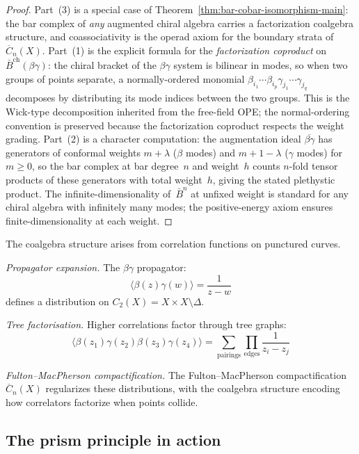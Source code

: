 \begin{proof}
Part~(3) is a special case of Theorem~\ref{thm:bar-cobar-isomorphism-main}: the bar complex of \emph{any} augmented chiral algebra carries a factorization coalgebra structure, and coassociativity is the operad axiom for the boundary strata of~$\overline{C}_n(X)$. Part~(1) is the explicit formula for the \emph{factorization coproduct} on $\bar{B}^{\mathrm{ch}}(\beta\gamma)$: the chiral bracket of the $\beta\gamma$ system is bilinear in modes, so when two groups of points separate, a normally-ordered monomial $\beta_{i_1}\cdots\beta_{i_p}\gamma_{j_1}\cdots\gamma_{j_q}$ decomposes by distributing its mode indices between the two groups. This is the Wick-type decomposition inherited from the free-field OPE; the normal-ordering convention is preserved because the factorization coproduct respects the weight grading. Part~(2) is a character computation: the augmentation ideal $\overline{\beta\gamma}$ has generators of conformal weights $m + \lambda$ ($\beta$ modes) and $m + 1 - \lambda$ ($\gamma$ modes) for $m \geq 0$, so the bar complex at bar degree~$n$ and weight~$h$ counts $n$-fold tensor products of these generators with total weight~$h$, giving the stated plethystic product. The infinite-dimensionality of~$\bar{B}^n$ at unfixed weight is standard for any chiral algebra with infinitely many modes; the positive-energy axiom ensures finite-dimensionality at each weight.
\end{proof}

\begin{remark}
The coalgebra structure arises from correlation functions on punctured curves.

\emph{Propagator expansion.} The $\beta\gamma$ propagator:
\[
\langle \beta(z)\gamma(w) \rangle = \frac{1}{z-w}
\]
defines a distribution on $C_2(X) = X \times X \setminus \Delta$.

\emph{Tree factorisation.} Higher correlations factor through tree graphs:
\[
\langle \beta(z_1)\gamma(z_2)\beta(z_3)\gamma(z_4) \rangle =
\sum_{\text{pairings}} \prod_{\text{edges}} \frac{1}{z_i - z_j}
\]

\emph{Fulton--MacPherson compactification.} The Fulton--MacPherson compactification $\overline{C}_n(X)$
regularizes these distributions, with the coalgebra structure encoding how correlators
factorize when points collide.
\end{remark}

\subsection{The prism principle in action}

